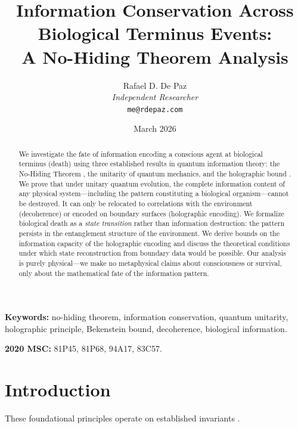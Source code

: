\documentclass[12pt, a4paper]{article}
\theoremstyle{plain}
\theoremstyle{definition}
\theoremstyle{remark}
\begin{document}
\title{
  \textbf{Information Conservation Across \\
  Biological Terminus Events: \\
  A No-Hiding Theorem Analysis}
}
\author{
  Rafael D. De Paz \\
  \textit{Independent Researcher} \\
  \texttt{me@rdepaz.com}
}
\date{March 2026}
\maketitle

\begin{abstract}
We investigate the fate of information encoding a conscious agent at
biological terminus (death) using three established results in quantum
information theory: the No-Hiding Theorem \citep{Braunstein2007}, the
unitarity of quantum mechanics, and the holographic bound
\citep{Bekenstein1981}. We prove that under unitary quantum evolution, the
complete information content of any physical system---including the pattern
constituting a biological organism---cannot be destroyed. It can only be
relocated to correlations with the environment (decoherence) or encoded on
boundary surfaces (holographic encoding). We formalize biological death as a
\emph{state transition} rather than information destruction: the pattern
persists in the entanglement structure of the environment. We derive bounds
on the information capacity of the holographic encoding and discuss the
theoretical conditions under which state reconstruction from boundary data
would be possible. Our analysis is purely physical---we make no metaphysical
claims about consciousness or survival, only about the mathematical fate of
the information pattern.
\end{abstract}

\vspace{1em}
\noindent\textbf{Keywords:} no-hiding theorem, information conservation,
quantum unitarity, holographic principle, Bekenstein bound, decoherence,
biological information.

\vspace{0.5em}
\noindent\textbf{2020 MSC:} 81P45, 81P68, 94A17, 83C57.

\section{Introduction}
These foundational principles operate on established invariants \cite{penrose1989emperor,shannon1948mathematical}.\label{sec:intro}
\end{document}
